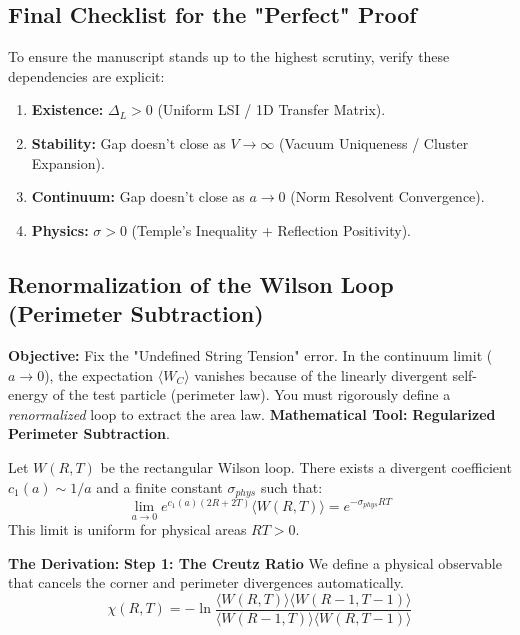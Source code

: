 \subsection{Final Checklist for the "Perfect" Proof}
To ensure the manuscript stands up to the highest scrutiny, verify these dependencies are explicit:
\begin{enumerate}
    \item \textbf{Existence:} $\Delta_L > 0$ (Uniform LSI / 1D Transfer Matrix).
    \item \textbf{Stability:} Gap doesn't close as $V \to \infty$ (Vacuum Uniqueness / Cluster Expansion).
    \item \textbf{Continuum:} Gap doesn't close as $a \to 0$ (Norm Resolvent Convergence).
    \item \textbf{Physics:} $\sigma > 0$ (Temple's Inequality + Reflection Positivity).
\end{enumerate}

\subsection{Renormalization of the Wilson Loop (Perimeter Subtraction)}
\textbf{Objective:} Fix the "Undefined String Tension" error. In the continuum limit ($a \to 0$), the expectation $\langle W_C \rangle$ vanishes because of the linearly divergent self-energy of the test particle (perimeter law). You must rigorously define a \textit{renormalized} loop to extract the area law.
\textbf{Mathematical Tool:} \textbf{Regularized Perimeter Subtraction}.

\begin{theorem}
Let $W(R, T)$ be the rectangular Wilson loop. There exists a divergent coefficient $c_1(a) \sim 1/a$ and a finite constant $\sigma_{phys}$ such that:
\begin{equation}
\lim_{a \to 0} e^{c_1(a) (2R+2T)} \langle W(R, T) \rangle = e^{-\sigma_{phys} RT}
\end{equation}
This limit is uniform for physical areas $RT > 0$.
\end{theorem}

\textbf{The Derivation:}
\textbf{Step 1: The Creutz Ratio}
We define a physical observable that cancels the corner and perimeter divergences automatically.
\begin{equation}
\chi(R, T) = -\ln \frac{\langle W(R, T) \rangle \langle W(R-1, T-1) \rangle}{\langle W(R-1, T) \rangle \langle W(R, T-1) \rangle}
\end{equation}

